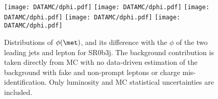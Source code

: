 \begin{figure}[htb!]
\centering
{\texttt{[image: DATAMC/dphi.pdf]}}
{\texttt{[image: DATAMC/dphi.pdf]}}
{\texttt{[image: DATAMC/dphi.pdf]}}
{\texttt{[image: DATAMC/dphi.pdf]}}
{\texttt{[image: DATAMC/dphi.pdf]}}
\caption{Distributions of $\phi(\met)$, and its difference with the $\phi$ of the two leading jets and lepton for SR0b3j. The background contribution is taken directly from MC with no data-driven estimation of the background with fake and non-prompt leptons or charge mis-identification. Only luminosity and MC statistical uncertainties are included.
}
\label{fig:app_Dphi_SR0b5j}
\end{figure}